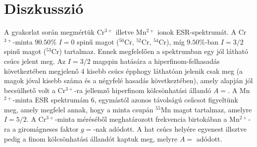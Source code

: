 \section{Diszkusszió}

A gyakorlat során megmértük Cr$^{3+}$ illetve Mn$^{2+}$ ionok ESR-spektrumát. A Cr$^{3+}$-minta $90.50\%$ $I=0$ spinű magot ($^{50}$Cr, $^{52}$Cr, $^{54}$Cr), míg $9.50\%$-ban $I=3/2$ spinű magot ($^{53}$Cr) tartalmaz. Ennek megfelelően a spektrumban egy jól látható csúcs jelent meg. Az $I=3/2$ magspin hatására a hiperfinom-felhasadás következtében megjelenő 4 kisebb csúcs épphogy láthatóan jelenik csak meg (a magok jóval kisebb száma és a négyfelé hasadás következtében), amely alapján jól becsülhető volt a Cr$^{3+}$-ra jellemző hiperfinom kölcsönhatási állandó $A=$. 
A Mn$^{2+}$-minta ESR spektrumám 6, egymástól azonos távolságú csűcsot figyeltünk meg, amely megfelel annak, hogy a minta csupán $^{55}$Mn magot tartalmaz, amelyre $I= 5/2$. A Cr$^{3+}$-minta méréséből meghatározott frekvencia birtokában a Mn$^{2+}$-ra a giromágneses faktor $g=$-nak adódott. A hat csúcs helyére egyenest illsztve pedig a finom kölcsönhatási állandót kaptuk meg, melyre $A=$ adódott.